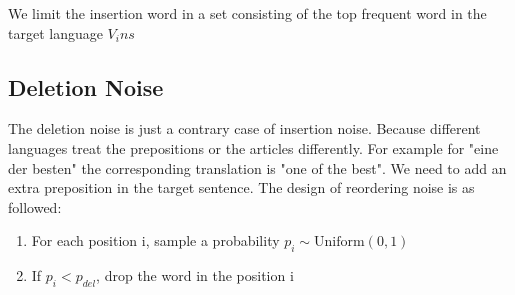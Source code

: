 	We limit the insertion word in a set consisting of the top frequent word in the target language ${V_ins}$

	\subsection{Deletion Noise}
	The deletion noise is just a contrary case of insertion noise. Because different languages treat the prepositions or the articles differently. For example for "eine der besten" the corresponding translation is "one of the best". We need to add an extra preposition in the target sentence.  The design of reordering noise is as followed:
	
	\begin{enumerate}
		\item For each position i, sample a probability ${p_i \sim \textrm{Uniform}(0,1)}$
		\item If ${p_i} < p_{del}$, drop the word in the position i
	\end{enumerate}
	
	

	
	
	
	
	
	
	
	
	
	
	
	
	
	
	
	
	
	
	
	
	
	
	
	
	
	
	
	